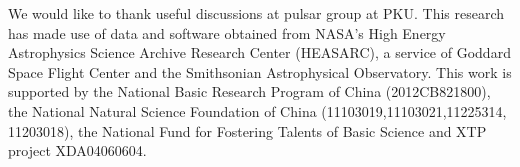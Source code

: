 \documentclass[]{raa}
\begin{document}
%







\begin{acknowledgements}

We would like to thank useful discussions at pulsar group at PKU.
%
This research has made use of data and software obtained from NASA's High Energy Astrophysics Science Archive Research Center (HEASARC), a service of Goddard Space Flight Center and the Smithsonian Astrophysical Observatory.
%
This work is supported by the National Basic Research Program of China (2012CB821800), the National Natural Science Foundation of China (11103019,11103021,11225314, 11203018), the National Fund for Fostering Talents of Basic Science and XTP project XDA04060604.
%


\end{acknowledgements}
  


\end{document}
